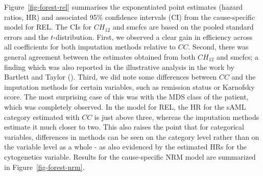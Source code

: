 \documentclass[
  letterpaper,
  DIV=11,
  numbers=noendperiod]{scrreprt}
\begin{document}
Figure~\ref{fig-forest-rel} summarises the exponentiated point estimates
(hazard ratios, HR) and associated 95\% confidence intervals (CI) from
the cause-specific model for REL. The CIs for \(CH_{12}\) and smcfcs are
based on the pooled standard errors and the \(t\)-distribution. First,
we observed a clear gain in efficiency across all coefficients for both
imputation methods relative to \(CC\). Second, there was general
agreement between the estimates obtained from both \(CH_{12}\) and
smcfcs; a finding which was also reported in the illustrative analysis
in the work by Bartlett and Taylor
(). Third, we
did note some differences between \(CC\) and the imputation methods for
certain variables, such as remission status or Karnofsky score. The most
surprising case of this was with the MDS class of the patient, which was
completely observed. In the model for REL, the HR for the sAML category
estimated with \(CC\) is just above three, whereas the imputation
methods estimate it much closer to two. This also raises the point that
for categorical variables, differences in methods can be seen on the
category level rather than on the variable level as a whole - as also
evidenced by the estimated HRs for the cytogenetics variable. Results
for the cause-specific NRM model are summarized in
Figure~\ref{fig-forest-nrm}.
\end{document}
